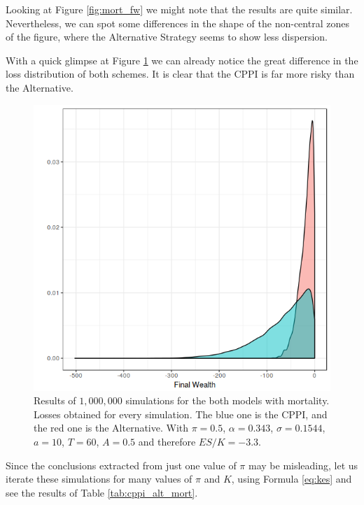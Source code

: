 Looking at Figure \ref{fig:mort_fw} we might note that the results are quite similar. Nevertheless, we can spot some differences in the shape of the non-central zones of the figure, where the Alternative Strategy seems to show less dispersion.

With a quick glimpse at Figure \ref{fig:mort_loss} we can already notice the great difference in the loss distribution of both schemes. It is clear that the CPPI is far more risky than the Alternative.

\begin{figure}[h]
    \centering
    \includegraphics[scale=0.75]{./images/loss_both_mort.png}
    \caption{Results of $1,000,000$ simulations for the both models with mortality. Losses obtained for every simulation. The blue one is the CPPI, and the red one is the Alternative. With $\pi = 0.5$, $\alpha = 0.343$, $\sigma = 0.1544$, $a = 10$, $T = 60$, $A = 0.5$ and therefore $ES/K = -3.3$.}
    \label{fig:mort_loss}
\end{figure}

Since the conclusions extracted from just one value of $\pi$ may be misleading, let us iterate these simulations for many values of $\pi$ and $K$, using Formula \ref{eq:kes} and see the results of Table \ref{tab:cppi_alt_mort}.

